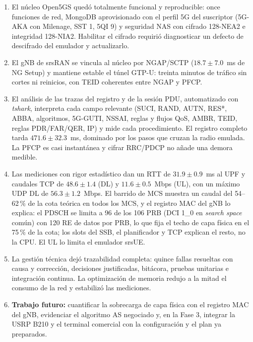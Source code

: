 \documentclass[conference]{IEEEtran}
\begin{document}
\begin{enumerate}
  \item El núcleo Open5GS quedó totalmente funcional y reproducible: once funciones de red, MongoDB aprovisionado con el perfil 5G del suscriptor (5G-AKA con Milenage, SST 1, 5QI 9) y seguridad NAS con cifrado 128-NEA2 e integridad 128-NIA2. Habilitar el cifrado requirió diagnosticar un defecto de descifrado del emulador y actualizarlo.
  \item El gNB de srsRAN se vincula al núcleo por NGAP/SCTP ($18.7\pm7.0$~ms de NG Setup) y mantiene estable el túnel GTP-U: treinta minutos de tráfico sin cortes ni reinicios, con TEID coherentes entre NGAP y PFCP.
  \item El análisis de las trazas del registro y de la sesión PDU, automatizado con \textit{tshark}, interpreta cada campo relevante (SUCI, RAND, AUTN, RES*, ABBA, algoritmos, 5G-GUTI, NSSAI, reglas y flujos QoS, AMBR, TEID, reglas PDR/FAR/QER, IP) y mide cada procedimiento. El registro completo tarda $471.6\pm32.3$~ms, dominado por los pasos que cruzan la radio emulada. La PFCP es casi instantánea y cifrar RRC/PDCP no añade una demora medible.
  \item Las mediciones con rigor estadístico dan un RTT de $31.9\pm0.9$~ms al UPF y caudales TCP de $48.6\pm1.4$ (DL) y $11.6\pm0.5$~Mbps (UL), con un máximo UDP DL de $56.3\pm1.2$~Mbps. El barrido de MCS muestra un caudal del 54--62\,\% de la cota teórica en todos los MCS, y el registro MAC del gNB lo explica: el PDSCH se limita a 96 de los 106 PRB (DCI 1\_0 en \textit{search space} común) con 120 RE de datos por PRB, lo que fija el techo de capa física en el 75\,\% de la cota; los slots del SSB, el planificador y TCP explican el resto, no la CPU. El UL lo limita el emulador srsUE.
  \item La gestión técnica dejó trazabilidad completa: quince fallas resueltas con causa y corrección, decisiones justificadas, bitácora, pruebas unitarias e integración continua. La optimización de memoria redujo a la mitad el consumo de la red y estabilizó las mediciones.
  \item \textbf{Trabajo futuro:} cuantificar la sobrecarga de capa física con el registro MAC del gNB, evidenciar el algoritmo AS negociado y, en la Fase 3, integrar la USRP B210 y el terminal comercial con la configuración y el plan ya preparados.
\end{enumerate}
\end{document}
